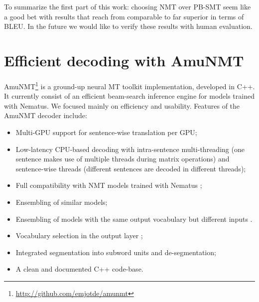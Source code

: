 \documentclass[11pt]{article}
\begin{document}
To summarize the first part of this work: choosing NMT over PB-SMT seem like a good bet with results that reach from comparable to far superior in terms of BLEU. In the future we would like to verify these results with  human evaluation.

\section{Efficient decoding with AmuNMT}
AmuNMT\footnote{\url{http://github.com/emjotde/amunmt}} is a ground-up neural MT toolkit implementation, developed in C++. It currently consist of an efficient beam-search inference engine for models trained with Nematus. We focused mainly on efficiency and usability. Features of the AmuNMT decoder include:

\begin{itemize}
 \item Multi-GPU support for sentence-wise translation per GPU;
  \item Low-latency CPU-based decoding with intra-sentence multi-threading (one sentence makes use of multiple threads during matrix operations) and sentence-wise threads (different sentences are decoded in different threads);
 \item Full compatibility with NMT models trained with Nematus \cite{DBLP:conf/wmt/SennrichHB16};
 \item Ensembling of similar models;
 \item Ensembling of models with the same output vocabulary but different inputs \cite{DBLP:journals/corr/Junczys-Dowmunt16}.
 \item Vocabulary selection in the output layer \cite{DBLP:conf/acl/JeanCMB15,DBLP:conf/acl/MiWI16};
 \item Integrated segmentation into subword units \cite{DBLP:journals/corr/SennrichHB15} and de-segmentation;
 \item A clean and documented C++ code-base.
\end{itemize}
\end{document}
